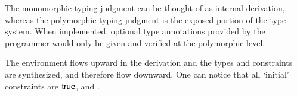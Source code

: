 \documentclass{report}
\begin{document}
  The monomorphic typing judgment can be thought of as internal derivation, whereas
  the polymorphic typing judgment is the exposed portion of the type system.
  When implemented, optional type annotations
  provided by the programmer would only be given and verified at the polymorphic level.
  The environment flows upward in the derivation and the types  and constraints are synthesized, and
  therefore flow downward. One can notice that all `initial' constraints are $\textsf{true}$, \sdbase
  and \sdabs.
  
\end{document}

